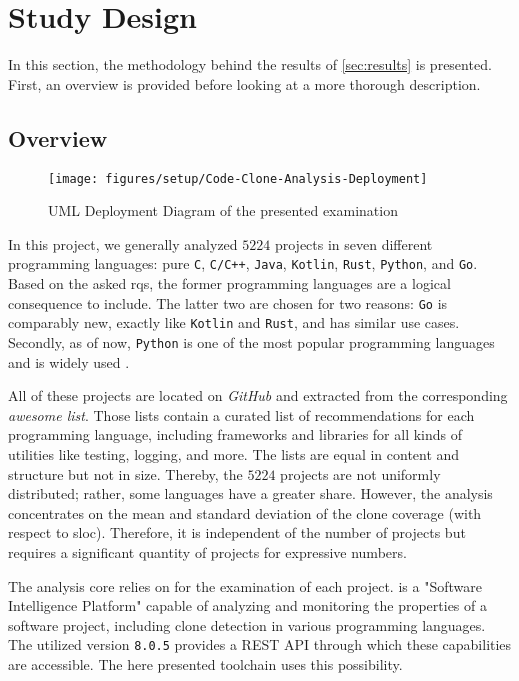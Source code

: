 
\section{Study Design}
\label{sec:study_design}

In this section, the methodology behind the results of \autoref{sec:results} is presented. First, an overview is provided before looking at a more thorough description.

\subsection{Overview}

\begin{figure}[tbh]
	\centering
	\texttt{[image: figures/setup/Code-Clone-Analysis-Deployment]}
	\caption{UML Deployment Diagram of the presented examination}
	\label{fig:overview_deployment}
\end{figure}

In this project, we generally analyzed $5224$ projects in seven different programming languages: pure \texttt{C}, \texttt{C/C++}, \texttt{Java}, \texttt{Kotlin}, \texttt{Rust}, \texttt{Python}, and \texttt{Go}. Based on the asked \acp{rq}, the former programming languages are a logical consequence to include. The latter two are chosen for two reasons: \texttt{Go} is comparably new, exactly like \texttt{Kotlin} and \texttt{Rust}, and has similar use cases. Secondly, as of now, \texttt{Python} is one of the most popular programming languages and is widely used \cite{stackoverflow2021languages}.

All of these projects are located on \textit{GitHub} and extracted from the corresponding \textit{awesome list}\awesomeFootnote{}. Those lists contain a curated list of recommendations for each programming language, including frameworks and libraries for all kinds of utilities like testing, logging, and more.
The lists are equal in content and structure but not in size. Thereby, the $5224$ projects are not uniformly distributed; rather, some languages have a greater share. However, the analysis concentrates on the mean and standard deviation of the clone coverage (with respect to \ac{sloc}). Therefore, it is independent of the number of projects but requires a significant quantity of projects for expressive numbers.

The analysis core relies on \teamscale{}\teamscaleFootnote{} for the examination of each project. \teamscale{} is a "Software Intelligence Platform" capable of analyzing and monitoring the properties of a software project, including clone detection in various programming languages. The utilized version \texttt{8.0.5} provides a REST API through which these capabilities are accessible. The here presented toolchain uses this possibility.


